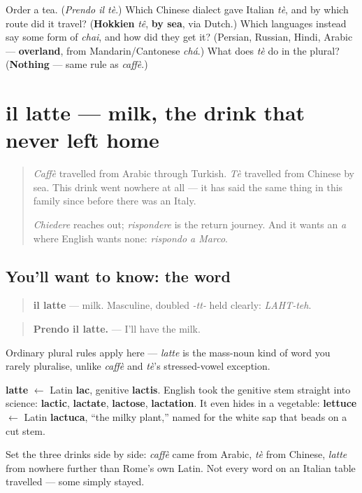 \begin{tcolorbox}[breakable,colback=teal!4,colframe=teal!35!black,title={Before you move on}]
Order a tea. (\emph{Prendo il tè}.) Which Chinese dialect gave Italian \emph{tè}, and by which route did it travel? (\textbf{Hokkien} \emph{tê}, \textbf{by sea}, via Dutch.) Which languages instead say some form of \emph{chai}, and how did they get it? (Persian, Russian, Hindi, Arabic — \textbf{overland}, from Mandarin/Cantonese \emph{chá}.) What does \emph{tè} do in the plural? (\textbf{Nothing} — same rule as \emph{caffè}.)
\end{tcolorbox}
\section[il latte]{il latte — milk, the drink that never left home}

\label{lesson:IT-C22-latte}



\begin{quote}
\emph{Caffè} travelled from Arabic through Turkish. \emph{Tè} travelled from Chinese by sea. This drink went nowhere at all — it has said the same thing in this family since before there was an Italy.

\emph{Chiedere} reaches out; \emph{rispondere} is the return journey. And it wants an \emph{a} where English wants none: \emph{rispondo a Marco}.
\end{quote}

\subsection*{You'll want to know: the word}
\begin{quote}
\textbf{il latte} — milk. Masculine, doubled \emph{-tt-} held clearly: \emph{LAHT-teh}.
\end{quote}

\begin{quote}
\textbf{Prendo il latte.} — I'll have the milk.
\end{quote}

Ordinary plural rules apply here — \emph{latte} is the mass-noun kind of word you rarely pluralise, unlike \emph{caffè} and \emph{tè}'s stressed-vowel exception.

\begin{cousinweb}
\textbf{latte} $\leftarrow$ Latin \textbf{lac}, genitive \textbf{lactis}. English took the genitive stem straight into science: \textbf{lactic}, \textbf{lactate}, \textbf{lactose}, \textbf{lactation}. It even hides in a vegetable: \textbf{lettuce} $\leftarrow$ Latin \textbf{lactuca}, \textquotedblleft{}the milky plant,\textquotedblright{} named for the white sap that beads on a cut stem.

Set the three drinks side by side: \emph{caffè} came from Arabic, \emph{tè} from Chinese, \emph{latte} from nowhere further than Rome's own Latin. Not every word on an Italian table travelled — some simply stayed.
\end{cousinweb}

